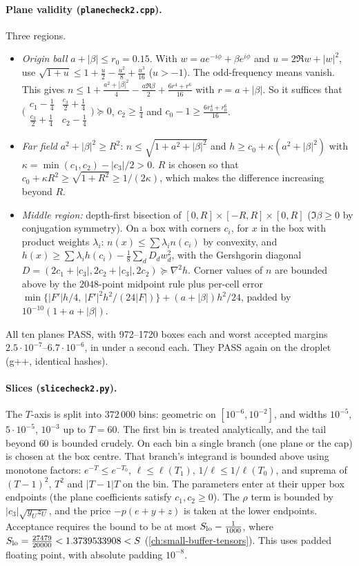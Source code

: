 \paragraph{Plane validity (\texttt{planecheck2.cpp}).} Three regions.
\begin{itemize}
\item\emph{Origin ball} $a+|\beta|\le r_0=0.15$. With $w=ae^{-i\phi}+\beta e^{i\phi}$ and $u=2\Re w+|w|^2$, use $\sqrt{1+u}\le1+\frac u2-\frac{u^2}8+\frac{u^3}{16}$ ($u>-1$).
The odd-frequency means vanish. This gives $n\le1+\frac{a^2+|\beta|^2}4-\frac{a\Re\beta}2+\frac{6r^4+r^6}{16}$ with $r=a+|\beta|$. So it suffices that
$\bigl(\begin{smallmatrix}c_1-\frac14&\frac{c_3}2+\frac14\\\frac{c_3}2+\frac14&c_2-\frac14\end{smallmatrix}\bigr)\succeq0$, $c_2\ge\frac14$ and
$c_0-1\ge\frac{6r_0^4+r_0^6}{16}$.
\item\emph{Far field} $a^2+|\beta|^2\ge R^2$: $n\le\sqrt{1+a^2+|\beta|^2}$ and $h\ge c_0+\kappa(a^2+|\beta|^2)$ with $\kappa=\min(c_1,c_2)-|c_3|/2>0$.
$R$ is chosen so that $c_0+\kappa R^2\ge\sqrt{1+R^2}\ge1/(2\kappa)$, which makes the difference increasing beyond $R$.
\item\emph{Middle region:} depth-first bisection of $[0,R]\times[-R,R]\times[0,R]$ ($\Im\beta\ge0$ by conjugation symmetry). On a box with corners $c_i$, for $x$
in the box with product weights $\lambda_i$: $n(x)\le\sum\lambda_in(c_i)$ by convexity, and
$h(x)\ge\sum\lambda_ih(c_i)-\frac18\sum_dD_dw_d^2$, with the Gershgorin diagonal $D=(2c_1+|c_3|,2c_2+|c_3|,2c_2)\succeq\nabla^2h$. Corner values of $n$ are bounded
above by the $2048$-point midpoint rule plus per-cell error $\min\{|F'|h/4,\ |F'|^2h^2/(24|F|)\}+(a+|\beta|)h^2/24$, padded by $10^{-10}(1+a+|\beta|)$.
\end{itemize}
All ten planes PASS, with 972--1720 boxes each and worst accepted margins $2.5\cdot10^{-7}$--$6.7\cdot10^{-6}$, in under a second each. They PASS again on the droplet
(g++, identical hashes).

\paragraph{Slices (\texttt{slicecheck2.py}).} The $T$-axis is split into $372\,000$ bins: geometric on $[10^{-6},10^{-2}]$, and widths $10^{-5}$, $5\cdot10^{-5}$,
$10^{-3}$ up to $T=60$. The first bin is treated analytically, and the tail beyond $60$ is bounded crudely. On each bin a single branch (one plane or the cap) is chosen
at the box centre. That branch's integrand is bounded above using monotone factors: $e^{-T}\le e^{-T_0}$, $\ell\le\ell(T_1)$, $1/\ell\le1/\ell(T_0)$, and suprema of
$(T-1)^2$, $T^2$ and $|T-1|T$ on the bin. The parameters enter at their upper box endpoints (the plane coefficients satisfy $c_1,c_2\ge0$). The $\rho$ term is
bounded by $|c_3|\sqrt{y_Uz_U}$, and the price $-p(e+y+z)$ is taken at the lower endpoints. Acceptance requires the bound to be at most
$S_{\rm lo}-\frac1{1000}$, where $S_{\rm lo}=\frac{27479}{20000}<1.3739533908<S$ (\autoref{ch:small-buffer-tensors}). This uses padded floating point,
with absolute padding $10^{-8}$.


